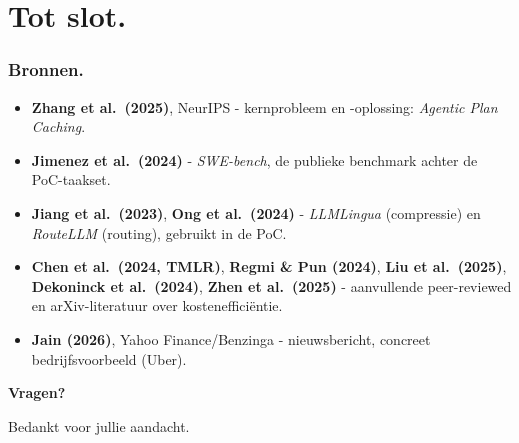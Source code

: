 \documentclass[aspectratio=169]{beamer}
\begin{document}
\section{Tot slot.}

\begin{frame}
    \frametitle{Bronnen.}

    \small
   \begin{itemize}
        \item \textbf{Zhang et al.\ (2025)}, NeurIPS - kernprobleem en
            -oplossing: \emph{Agentic Plan Caching}.
        \item \textbf{Jimenez et al.\ (2024)} - \emph{SWE-bench}, de
            publieke benchmark achter de PoC-taakset.
        \item \textbf{Jiang et al.\ (2023)}, \textbf{Ong et
            al.\ (2024)} - \emph{LLMLingua} (compressie) en
            \emph{RouteLLM} (routing), gebruikt in de PoC.
        \item \textbf{Chen et al.\ (2024, TMLR)}, \textbf{Regmi \& Pun
            (2024)}, \textbf{Liu et al.\ (2025)}, \textbf{Dekoninck et
            al.\ (2024)}, \textbf{Zhen et al.\ (2025)} - aanvullende
            peer-reviewed en arXiv-literatuur over kostenefficiëntie.
        \item \textbf{Jain (2026)}, Yahoo Finance/Benzinga - nieuws\-bericht,
            concreet bedrijfsvoorbeeld (Uber).
    \end{itemize}

\end{frame}

\begin{frame}
    {\Huge \textbf{Vragen?}}

    \bigskip
    Bedankt voor jullie aandacht.
\end{frame}
\end{document}
